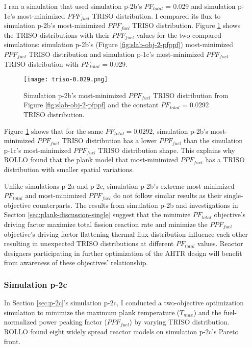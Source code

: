 I ran a simulation that used simulation p-2b's $PF_{total}$ = 0.029 and 
simulation p-1c's most-minimized $PPF_{fuel}$ TRISO distribution. 
I compared its flux to simulation p-2b's most-minimized $PPF_{fuel}$ TRISO 
distribution. 
Figure \ref{fig:triso-0.0292} shows the TRISO distributions with 
their $PPF_{fuel}$ values for the two compared 
simulations: simulation p-2b's (Figure \ref{fig:slab-obj-2-pfppf}) most-minimized 
$PPF_{fuel}$ TRISO distribution and simulation p-1c's most-minimized $PPF_{fuel}$ 
TRISO distribution with $PF_{total}$ = 0.029. 
\begin{figure}[htbp!]
    \centering
    \texttt{[image: triso-0.029.png]} 
    \caption{Simulation p-2b's most-minimized $PPF_{fuel}$ TRISO distribution 
    from Figure \ref{fig:slab-obj-2-pfppf} and the constant $PF_{total}$ = 0.0292
    TRISO distribution.}
    \label{fig:triso-0.0292}
\end{figure}
Figure \ref{fig:triso-0.0292} shows that for the same $PF_{total}=0.0292$, 
simulation p-2b's most-minimized $PPF_{fuel}$ TRISO distribution has a lower 
$PPF_{fuel}$ than the simulation p-1c's most-minimized $PPF_{fuel}$ TRISO distribution 
shape. 
This explains why \gls{ROLLO} found that the plank model that most-minimized 
$PPF_{fuel}$ has a TRISO distribution with smaller spatial variations. 

Unlike simulations p-2a and p-2c, simulation p-2b's extreme most-minimized $PF_{total}$ 
and most-minimized $PPF_{fuel}$ do not follow similar results as their single-objective 
counterparts.  
The results from simulation p-2b and investigations in Section 
\ref{sec:plank-discussion-single} suggest that the minimize $PF_{total}$ 
objective's driving factor maximize total fission reaction rate and 
minimize the $PPF_{fuel}$ objective's driving factor flattening thermal flux 
distribution influence each other resulting in unexpected TRISO distributions at 
different $PF_{total}$ values. 
Reactor designers participating in further optimization of the \gls{AHTR} design 
will benefit from awareness of these objectives' relationship. 

\subsubsection{Simulation p-2c}
In Section \ref{sec:p-2c}'s simulation p-2c, I conducted a two-objective 
optimization simulation to minimize the maximum plank temperature ($T_{max}$) and the 
fuel-normalized power peaking factor ($PPF_{fuel}$) by varying TRISO distribution. 
\gls{ROLLO} found eight widely spread reactor models on simulation p-2c's Pareto 
front. 

